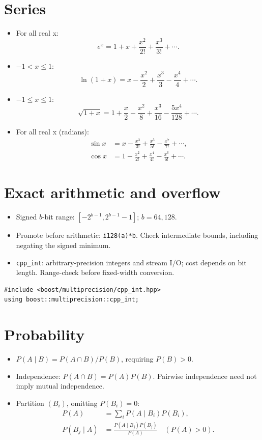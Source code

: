 \section{Series}
\begin{itemize}[nosep,leftmargin=*]
\item For all real x:
\[
 e^x=1+x+\frac{x^2}{2!}+\frac{x^3}{3!}+\cdots.
\]
\item $-1<x\le1$:
\[
 \ln(1+x)=x-\frac{x^2}{2}+\frac{x^3}{3}-\frac{x^4}{4}+\cdots.
\]
\item $-1\le x\le1$:
\[
 \sqrt{1+x}=1+\frac{x}{2}-\frac{x^2}{8}
 +\frac{x^3}{16}-\frac{5x^4}{128}+\cdots.
\]
\item For all real x (radians):
\[
 \begin{aligned}
 \sin x&=x-\frac{x^3}{3!}+\frac{x^5}{5!}-\frac{x^7}{7!}+\cdots,\\
 \cos x&=1-\frac{x^2}{2!}+\frac{x^4}{4!}-\frac{x^6}{6!}+\cdots.
 \end{aligned}
\]
\end{itemize}

\section{Exact arithmetic and overflow}
\begin{itemize}[nosep,leftmargin=*]
\item Signed $b$-bit range: $[-2^{b-1},2^{b-1}-1]$; $b=64,128$.
\item Promote before arithmetic: \texttt{i128(a)*b}.
Check intermediate bounds, including negating the signed minimum.
\end{itemize}
\begin{itemize}[nosep,leftmargin=*]
\item \texttt{cpp\_int}: arbitrary-precision integers and stream I/O;
cost depends on bit length. Range-check before fixed-width conversion.
\end{itemize}
\begin{lstlisting}[moredelim={**[s][\color{codeString}]{<}{>}}]
#include <boost/multiprecision/cpp_int.hpp>
using boost::multiprecision::cpp_int;
\end{lstlisting}

\section{Probability}
\begin{itemize}[nosep,leftmargin=*]
\item $P(A\mid B)=P(A\cap B)/P(B)$, requiring $P(B)>0$.
\item Independence: $P(A\cap B)=P(A)P(B)$.
Pairwise independence need not imply mutual independence.
\item Partition $(B_i)$, omitting $P(B_i)=0$:
\[
 \begin{aligned}
 P(A)&=\sum_i P(A\mid B_i)P(B_i),\\
 P(B_j\mid A)&=\frac{P(A\mid B_j)P(B_j)}{P(A)}
 \quad(P(A)>0).
 \end{aligned}
\]
\end{itemize}

